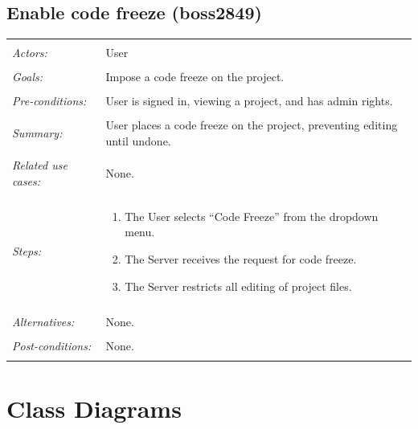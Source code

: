 \documentclass[11pt]{report}
\begin{document}
\section{Enable code freeze (boss2849)}
\begin{tabular}{ p{2cm} p{12cm} }
 \hline
 \\
 \textit{Actors:} & User \\ 
 \\
 \textit{Goals:} & Impose a code freeze on the project. \\
 \\
 \textit{Pre-conditions:} & User is signed in, viewing a project, and has admin rights.\\
 \\
 \textit{Summary:} & User places a code freeze on the project, preventing editing until undone. \\
 \\
 \textit{Related use cases:} & None. \\ 
 \\
 \textit{Steps:} & \begin{enumerate}
  \item The User selects ``Code Freeze'' from the dropdown menu.
  \item The Server receives the request for code freeze.
  \item The Server restricts all editing of project files.
 \end{enumerate} \\
 \\
 \textit{Alternatives:} & None. \\
 \\
 \textit{Post-conditions:} & None. \\
 \\
\hline
\end{tabular}

\chapter{Class Diagrams}
\end{document}

